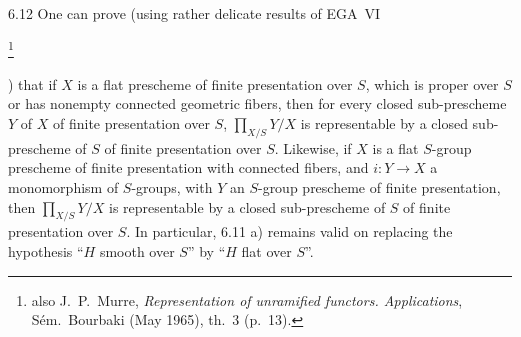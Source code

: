 \begin{remark}{6.12}\label{XI.6.12}
One can prove (using rather delicate results of EGA~VI{\renewcommand{\thefootnote}{*}\footnote{\Cf also J.~P.~Murre, \textit{Representation of unramified functors. Applications}, Sém.~Bourbaki  (May 1965), th.~3 (p.~13).}\addtocounter{footnote}{-1}}) that if $X$ is a flat prescheme of finite presentation over $S$, which is proper over $S$ or has nonempty connected geometric fibers, then for every closed sub-prescheme $Y$ of $X$ of finite presentation over $S$, $\prod_{X/S}Y/X$ is representable by a closed sub-prescheme of $S$ of finite presentation over $S$. Likewise, if $X$ is a flat $S$-group prescheme of finite presentation with connected fibers, and $i:Y\to X$ a monomorphism of $S$-groups, with $Y$ an $S$-group prescheme of finite presentation, then $\prod_{X/S}Y/X$ is representable by a closed sub-prescheme of $S$ of finite presentation over $S$. In particular, 6.11 a) remains valid on replacing the hypothesis ``$H$ smooth over $S$'' by ``$H$ flat over $S$''.
\end{remark}

